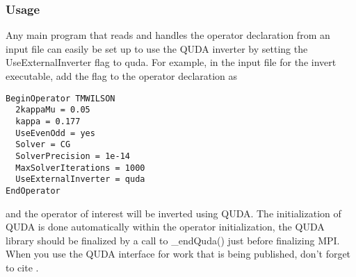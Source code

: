 \subsubsection{Usage}
Any main program that reads and handles the operator declaration from an input file can easily be set up to use the QUDA inverter by setting the {\ttfamily UseExternalInverter} flag to {\ttfamily quda}. For example, in the input file for the {\ttfamily invert} executable, add the flag to the operator declaration as
\begin{verbatim}
BeginOperator TMWILSON
  2kappaMu = 0.05
  kappa = 0.177
  UseEvenOdd = yes
  Solver = CG
  SolverPrecision = 1e-14
  MaxSolverIterations = 1000
  UseExternalInverter = quda
EndOperator
\end{verbatim}
and the operator of interest will be inverted using QUDA. The initialization of QUDA is done automatically within the operator initialization,  the QUDA library should be finalized by a call to {\ttfamily \_endQuda()} just before finalizing MPI. When you use the QUDA interface for work that is being published, don't forget to cite \cite{Clark:2009wm, Babich:2011np, Strelchenko:2013vaa}.

